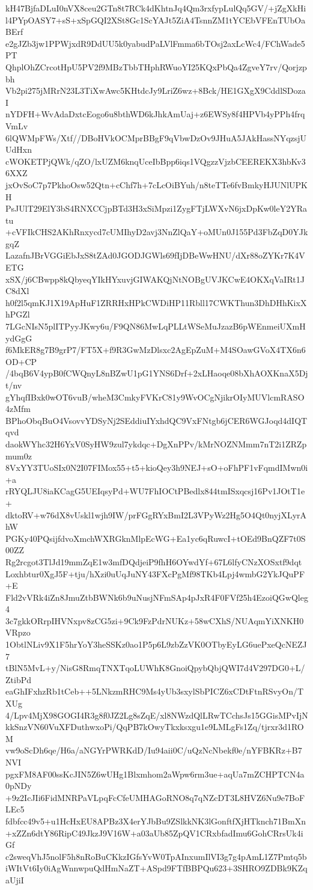 kH47BjfaDLuI0nVX8ceu2GTn8t7RCk4dKhtnJq4Qm3rxfypLulQq5GV/+jZgXkHi
l4PYpOASY7+sS+xSpGQI2XSt8Gc1ScYAJt5ZiA4TsnnZM1tYCEbVFEnTUbOaBErf
e2gJZb3jw1PPWjxdR9DdUU5k0yabudPaLVlFmma6bTOsj2axLcWc4/FChWade5PT
QhplOhZCrcotHpU5PV2f9MBzTbbTHphRWuoYI25KQxPbQa4ZgveY7rv/Qorjzpbh
Vb2pi275jMRrN23L3TiXwAwc5KHtdcJy9LriZ6wz+8Bck/HE1GXgX9CddlSDozaI
nYDFH+WvAdaDxtcEogo6u8bthWD6kJhkAmUaj+z6EWSy8f4HPVb4yPPh4frqVmLv
6lQWMpFWs/Xtf//DBoHVkOCMprBBgF9qVbwDzOv9JHuA5JAkHassNYqzsjUUdHxn
cWOKETPjQWk/qZO/lxUZM6knqUceIbBpp6iqs1VQgzzVjzbCEEREKX3hbKv36XXZ
jxOvSoC7p7PkhoOsw52Qtn+cChf7h+7cLcOiBYuh/n8teTTe6fvBmkyHJUNlUPKH
PsJUlT29ElY3bS4RNXCCjpBTd3H3xSiMpzi1ZygFTjLWXvN6jxDpKw0leY2YRatu
+cVFIkCHS2AKhRnxycd7cUMIhyD2avj3NnZlQaY+oMUn0J155Pd3FbZqD0YJkgqZ
LazafnJBrVGGiEbJxS8tZAd0JGODJGWls69fIjDBeWwHNU/dXr88oZYKr7K4VETG
xSX/j6CBwpp8kQbyeqYIkHYxuvjGIWAKQjNtNOBgUVJKCwE4OKXqVaIRt1JC8dXl
h0f2l5qmKJ1X19ApHuF1ZRRHxHPkCWDiHP11Rbll17CWKThun3DhDHhKixXhPGZl
7LGcNIsN5plITPyyJKwy6u/F9QN86MwLqPLLtWSeMuJzazB6pWEnmeiUXmHydGgG
f6MkER8g7B9grP7/FT5X+f9R3GwMzDlsxc2AgEpZuM+M4SOawGVoX4TX6n6OD+CP
/4bqB6V4ypB0fCWQnyL8nBZwU1pG1YNS6Drf+2xLHaoqe08bXhAOXKnaX5Djt/nv
gYhqfIBxk0wOT6vuB/wheM3CmkyFVKrC81y9WvOCgNjikrOIyMUVlcmRASO4zMfm
BPhoObqBuO4VsovvYDSyNj2SEddiuIYxhdQC9VxFNtgb6jCER6WGJoqd4dIQTqvd
daokWYhc32H6YxV0SyHW9zul7ykdqc+DgXnPPv/kMrNOZNMmm7nT2i1ZRZpmum0z
8VxYY3TUoSIx0N2I07FIMox55+t5+kioQey3h9NEJ+sO+oFhPF1vFqmdIMwn0i+a
rRYQLJU8iaKCagG5UEIqsyPd+WU7FhIOCtPBedlx844tmISxqcsj16Pv1JOtT1e+
dktoRV+w76dX8vUskl1wjh9IW/prFGgRYxBmI2L3VPyWz2Hg5O4Qt0nyjXLyrAhW
PGKy40PQsijfdvoXmchWXRGknMlpEcWG+Ea1yc6qRuwcI+tOEd9BnQZF7t0S00ZZ
Rg2rcgot3TlJd19mmZqE1w3mfDQdjeiP9fhH6OYwdYf+67L6lfyCNzXOSxtf9dqt
Loxhbtur0XgJ5F+tju/hXzi0uUqJuNY43FXcPgMf98TKb4Lpj4wmbG2YkJQuPF+E
Fld2vVRk4iZn8JmuZtbBWNk6b9uNusjNFmSAp4pJxR4F0FVf25h4EzoiQGwQleg4
3c7gkkORrpIHVNxpv8zCG5zi+9Ck9FzPdrNUKz+58wCXhS/NUAqmYiXNKH0VRpzo
1ObtlNLiv9X1F5hrYoY3heSSKz0ao1P5p6L9zbZzVK0OTbyEyLG6uePxeQcNEZJ7
tBlN5MvL+y/NisG8RmqTNXTqoLUWhK8GnoiQpybQbjQWI7d4V297DG0+L/ZtibPd
eaGhIFxhzRb1tCeb++5LNkzmRHC9Ms4yUb3sxylSbPICZ6xCDtFtnRSvyOn/TXUg
4/Lpv4MjX98GOGI4R3g8f0JZ2Lg8sZqE/xl8NWzdQlLRwTCchsJs15GGisMPvIjN
kkSnzVN60VuXFDuthwxoPi/QqPB7kOwyTkxksxgu1e9LMLgFs1Zq/tjrxr3d1ROM
vw9oScDh6qe/H6a/aNGYrPWRKdD/Iu94aii0C/uQzNcNbekf0e/nYFBKRz+B7NVI
pgxFM8AF00ssKcJIN5Z6wUHg1Blxmhom2aWpw6rm3ue+aqUa7mZCHPTCN4a0pNDy
+9z2IcJIi6FidMNRPaVLpqFcCfeUMHAGoRNO8q7qNZcDT3L8HVZ6Nu9e7BoFLEc5
fdbfcc49v5+u1HcHxEU8APBz3X4erYJbBu9ZSlkkNK3lGonftfXjHTknch71BmXn
+xZZn6dtY86RipC49JkzJ9V16W+a03aUb85ZpQV1CRxbfadImu6GohCRrsUk4iGf
c2sweqVhJ5nolF5h8nRoBuCKkzIGfsYvW0TpAInxumIlVI3g7g4pAmL1Z7Pmtq5b
iWItVt6Iy0iAgWnnwpuQdHmNaZT+ASpd9FTfBBPQu623+3SHRO9ZDBk9KZqaUjiI
